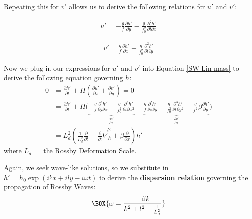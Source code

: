 Repeating this for $v'$ allows us to derive the following relations for $u'$ and $v'$:

\begin{minipage}{.48\linewidth}
    \begin{align*}
        u'=-\frac{g}{f}\frac{\partial h'}{\partial y}-\frac{g}{f_0^2}\frac{\partial^2 h'}{\partial t \partial x}
    \end{align*}
\end{minipage}
\hfill
\begin{minipage}{0.48\linewidth}
    \begin{align*}
        v'=\frac{g}{f}\frac{\partial h'}{\partial x}-\frac{g}{f_0^2}\frac{\partial^2 h'}{\partial t \partial y}
    \end{align*}
\end{minipage}

Now we plug in our expressions for $u'$ and $v'$ into Equation \ref{SW Lin mass} to derive the following equation governing $h$:
\begin{align*}
    0&=\frac{\partial h'}{\partial t}+H\left( \frac{\partial u'}{\partial x}+\frac{\partial v'}{\partial y} \right)=0
    \\
    &= \frac{\partial h'}{\partial t}+H\biggl( 
        \underbrace{-\frac{g}{f}\frac{\partial^2 h'}{\partial y \partial x}-\frac{g}{f_0^2}\frac{\partial^3 h'}{\partial t \partial x^2}}_{\frac{\partial u'}{\partial x}}
        +
        \underbrace{\frac{g}{f}\frac{\partial^2 h'}{\partial x\partial y}-\frac{g}{f_0^2}\frac{\partial^3 h'}{\partial t \partial y^2}
        -\frac{g}{f^2}\beta \frac{\partial h'}{\partial y}}_{\frac{\partial v'}{\partial x}}
     \biggr)
    \\
    &=L_d^2\left( \frac{1}{L_d^2}\frac{\partial}{\partial t} + \frac{\partial}{\partial t}\vec{\nabla}_h^2 + \beta \frac{\partial}{\partial x}\right)h'
\end{align*}
where $L_d=$ the \hyperref[SW Def Radius Box]{Rossby Deformation Scale}.

Again, we seek wave-like solutions, so we substitute in $h'=h_0 \exp\left( ikx+ily-i\omega t \right)$ to derive the \textbf{dispersion relation} governing the propagation of Rossby Waves:
\begin{gather}
    \BOX{\omega = \frac{-\beta k}{k^2 + l^2 + \frac{1}{L_d^2}}}
\end{gather}

